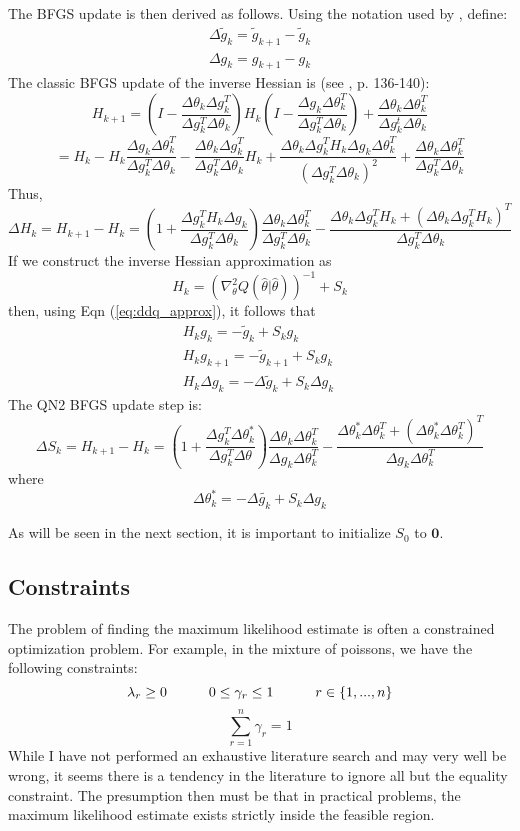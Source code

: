 \documentclass[letter,12pt]{article}
\begin{document}
The BFGS update is then derived as follows.  Using the notation used by \cite{jamshidianj97}, define:
\[
\begin{array}{l}
\Delta \tilde{g}_k = \tilde{g}_{k+1} - \tilde{g}_{k} \\
\Delta g_k = g_{k+1} - g_k
\end{array}
\]
The classic BFGS update of the inverse Hessian is (see \cite{nocedalwright_BFGS}, p. 136-140):
\[
H_{k+1} = (I - \frac{\Delta \theta_k\Delta g_k^T}{\Delta g_k^T\Delta \theta_k})H_k(I-\frac{\Delta g_k\Delta \theta_k^T}{\Delta g_k^T\Delta \theta_k})+\frac{\Delta \theta_k\Delta \theta_k^T}{\Delta g_k^t\Delta \theta_k}
\]
\[
= H_k - H_k\frac{\Delta g_k\Delta \theta_k^T}{\Delta g_k^T\Delta \theta_k} - \frac{\Delta \theta_k\Delta g_k^T}{\Delta g_k^T\Delta \theta_k}H_k + \frac{\Delta \theta_k\Delta g_k^TH_k\Delta g_k\Delta \theta_k^T}{(\Delta g_k^T\Delta \theta_k)^2}+\frac{\Delta \theta_k\Delta \theta_k^T}{\Delta g_k^T\Delta \theta_k}
\]
Thus,
\[
\Delta H_k = H_{k+1} - H_k
= (1+\frac{\Delta g_k^TH_k\Delta g_k}{\Delta g_k^T\Delta \theta_k})\frac{\Delta \theta_k\Delta \theta_k^T}{\Delta g_k^T\Delta \theta_k} - \frac{\Delta \theta_k\Delta g_k^TH_k + (\Delta \theta_k\Delta g_k^TH_k)^T}{\Delta g_k^T\Delta \theta_k}
\]
If we construct the inverse Hessian approximation as
\[
H_k = (\nabla^2_{\theta}Q(\hat{\theta}|\hat{\theta}))^{-1} + S_k
\]
then, using Eqn (\ref{eq:ddq_approx}), it follows that
\[\begin{array}{c}
H_k  g_k =  -\tilde{g}_k + S_kg_k
\\
H_k  g_{k+1} = -\tilde{g}_{k+1} + S_kg_k
\\
H_k \Delta g_k = -\Delta \tilde{g}_k + S_k\Delta g_k
\end{array}\
\]
The QN2 BFGS update step is:
\begin{equation} \label{eq:BFGS}
\Delta S_k = H_{k+1} - H_k =
\left(
1 + \frac{\Delta g_k^T \Delta \theta_k^*}{\Delta g_k^T \Delta \theta}
\right)
\frac{\Delta \theta_k \Delta \theta_k^T}{\Delta g_k \Delta \theta_k^T}
-
\frac{\Delta \theta_k^* \Delta \theta_k^T + (\Delta \theta_k^* \Delta \theta_k^T)^T}{\Delta g_k \Delta \theta_k^T}
\end{equation}
where
\[
\Delta \theta_k^* = -\Delta \tilde{g_k} + S_k \Delta g_k
\]

As will be seen in the next section, it is important to initialize $S_0$ to $\boldsymbol{0}$.


\subsection{Constraints}
The problem of finding the maximum likelihood estimate is often a constrained optimization problem.  For example, in the mixture of poissons, we have the following constraints:
\[
\lambda_r \geq 0 \indent \indent
0 \leq \gamma_r \leq 1 \indent \indent
r \in \{1,...,n\}
\]
\[
\sum_{r=1}^{n} \gamma_r = 1
\]
While I have not performed an exhaustive literature search and may very well be wrong, it seems there is a tendency in the literature to ignore all but the equality constraint.  The presumption then must be that in practical problems, the maximum likelihood estimate exists strictly inside the feasible region.  
\end{document}
